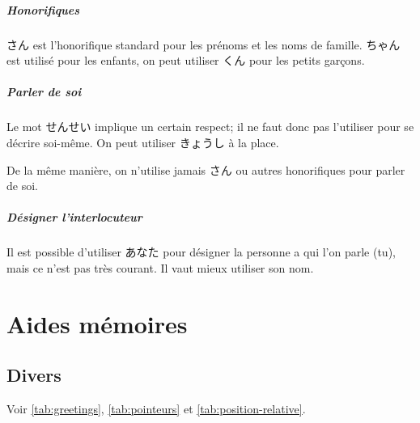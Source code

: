 \documentclass[a4paper,10pt,french,openany]{memoir}
\begin{document}
\paragraph{Honorifiques}
さん est l'honorifique standard pour les prénoms et les noms de famille. ちゃん est utilisé pour les enfants, on peut utiliser くん pour les petits garçons.

\paragraph{Parler de soi}
Le mot せんせい implique un certain respect; il ne faut donc pas l'utiliser pour se décrire soi-même. On peut utiliser きょうし à la place.

De la même manière, on n'utilise jamais さん ou autres honorifiques pour parler de soi.

\paragraph{Désigner l'interlocuteur}
Il est possible d'utiliser あなた pour désigner la personne a qui l'on parle (tu), mais ce n'est pas très courant. Il vaut mieux utiliser son nom.

\chapter{Aides mémoires}

\section{Divers}

Voir \autoref{tab:greetings}, \autoref{tab:pointeurs} et \autoref{tab:position-relative}.
\end{document}

